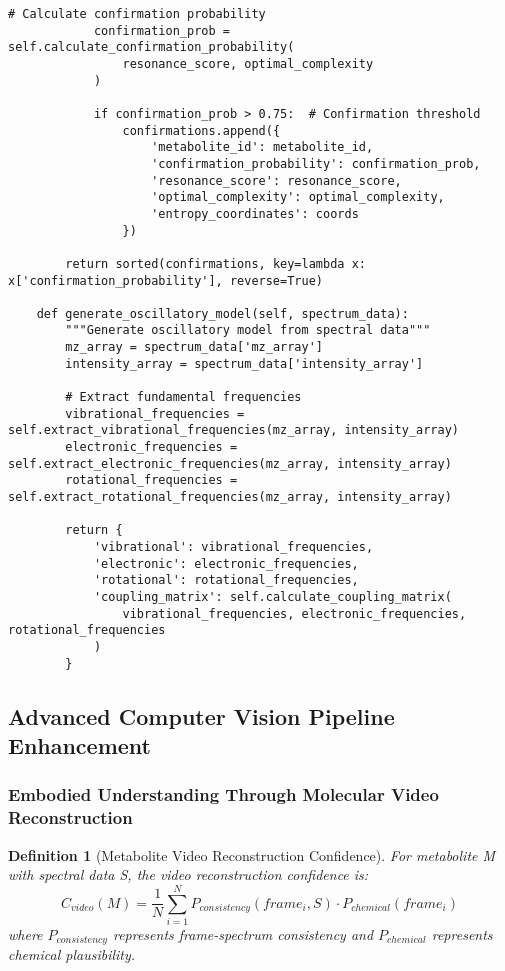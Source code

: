 \documentclass[12pt,a4paper]{article}
\newtheorem{definition}{Definition}
\begin{document}
\begin{lstlisting}[style=pythonstyle, caption=S-Entropy Compression Implementation for Metabolomics]
            # Calculate confirmation probability
            confirmation_prob = self.calculate_confirmation_probability(
                resonance_score, optimal_complexity
            )
            
            if confirmation_prob > 0.75:  # Confirmation threshold
                confirmations.append({
                    'metabolite_id': metabolite_id,
                    'confirmation_probability': confirmation_prob,
                    'resonance_score': resonance_score,
                    'optimal_complexity': optimal_complexity,
                    'entropy_coordinates': coords
                })
        
        return sorted(confirmations, key=lambda x: x['confirmation_probability'], reverse=True)
    
    def generate_oscillatory_model(self, spectrum_data):
        """Generate oscillatory model from spectral data"""
        mz_array = spectrum_data['mz_array']
        intensity_array = spectrum_data['intensity_array']
        
        # Extract fundamental frequencies
        vibrational_frequencies = self.extract_vibrational_frequencies(mz_array, intensity_array)
        electronic_frequencies = self.extract_electronic_frequencies(mz_array, intensity_array)
        rotational_frequencies = self.extract_rotational_frequencies(mz_array, intensity_array)
        
        return {
            'vibrational': vibrational_frequencies,
            'electronic': electronic_frequencies,
            'rotational': rotational_frequencies,
            'coupling_matrix': self.calculate_coupling_matrix(
                vibrational_frequencies, electronic_frequencies, rotational_frequencies
            )
        }
\end{lstlisting}

\subsection{Advanced Computer Vision Pipeline Enhancement}

\subsubsection{Embodied Understanding Through Molecular Video Reconstruction}

\begin{definition}[Metabolite Video Reconstruction Confidence]
For metabolite M with spectral data S, the video reconstruction confidence is:
\begin{equation}
C_{video}(M) = \frac{1}{N} \sum_{i=1}^{N} P_{consistency}(frame_i, S) \cdot P_{chemical}(frame_i)
\end{equation}
where $P_{consistency}$ represents frame-spectrum consistency and $P_{chemical}$ represents chemical plausibility.
\end{definition}
\end{document}
